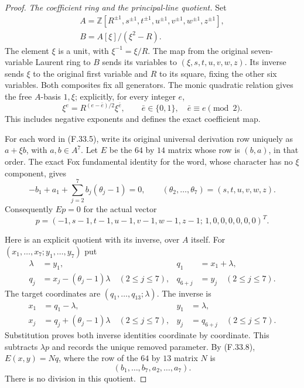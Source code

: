 \begin{proof}
\emph{The coefficient ring and the principal-line quotient.}
Set
\[
 \begin{gathered}
 A=\mathbb Z[R^{\pm1},s^{\pm1},t^{\pm1},u^{\pm1},
                         v^{\pm1},w^{\pm1},z^{\pm1}],\\
                         B=A[\xi]/(\xi^2-R).
 \end{gathered}
                                                               \tag{F.33.6}
\]
The element $\xi$ is a unit, with
$\xi^{-1}=\xi/R$. The map from the
original seven-variable Laurent ring
to $B$ sends its variables to
$(\xi,s,t,u,v,w,z)$. Its inverse sends
$\xi$ to the original first variable
and $R$ to its square, fixing the other
six variables. Both composites fix all
generators. The monic quadratic relation
gives the free $A$-basis $1,\xi$;
explicitly, for every integer $e$,
\[
       \xi^e=R^{(e-\bar e)/2}\xi^{\bar e},
       \qquad \bar e\in\{0,1\},\quad
                         \bar e\equiv e\pmod2.
                                                               \tag{F.33.7}
\]
This includes negative exponents and
defines the exact coefficient map.

For each word in (F.33.5), write its
original universal derivation row
uniquely as $a+\xi b$, with $a,b\in A^7$.
Let $E$ be the $64$ by $14$ matrix whose
row is $(b,a)$, in that order.
The exact Fox fundamental identity for
the word, whose character has no $\xi$
component, gives
\[
 -b_1+a_1+\sum_{j=2}^7b_j(\theta_j-1)=0,
       \qquad(\theta_2,\ldots,\theta_7)=(s,t,u,v,w,z).
                                                               \tag{F.33.8}
\]
Consequently $Ep=0$ for the actual vector
\[
 p=(-1,s-1,t-1,u-1,v-1,w-1,z-1;\,1,0,0,0,0,0,0)^T.
                                                               \tag{F.33.9}
\]

Here is an explicit quotient with its
inverse, over $A$ itself. For
$(x_1,\ldots,x_7;y_1,\ldots,y_7)$ put
\[
 \begin{aligned}
 \lambda&=y_1,&q_1&=x_1+\lambda,\\
 q_j&=x_j-(\theta_j-1)\lambda\quad(2\le j\le7),&
 q_{6+j}&=y_j\quad(2\le j\le7).
 \end{aligned}                                                \tag{F.33.10}
\]
The target coordinates are $(q_1,\ldots,q_{13};\lambda)$.
The inverse is
\[
 \begin{aligned}
 x_1&=q_1-\lambda,&y_1&=\lambda,\\
 x_j&=q_j+(\theta_j-1)\lambda\quad(2\le j\le7),&
 y_j&=q_{6+j}\quad(2\le j\le7).
 \end{aligned}                                                \tag{F.33.11}
\]
Substitution proves both inverse
identities coordinate by coordinate.
This subtracts $\lambda p$ and records
the unique removed parameter. By
(F.33.8), $E(x,y)=Nq$, where the row of
the $64$ by $13$ matrix $N$ is
\[
              (b_1,\ldots,b_7,a_2,\ldots,a_7).
                                                               \tag{F.33.12}
\]
There is no division in this quotient.


\end{proof}
